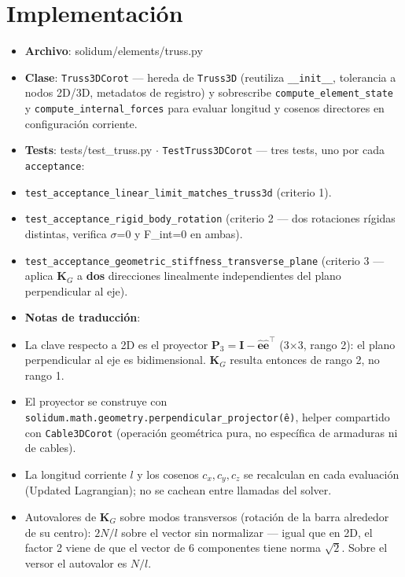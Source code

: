 \documentclass[11pt,letterpaper,oneside]{report}
\begin{document}
\section{Implementación}

\begin{itemize}
  \item \textbf{Archivo}: solidum/elements/truss.py
  \item \textbf{Clase}: \texttt{Truss3DCorot} --- hereda de \texttt{Truss3D} (reutiliza \texttt{\_\_init\_\_}, tolerancia a nodos 2D/3D, metadatos de registro) y sobrescribe \texttt{compute\_element\_state} y \texttt{compute\_internal\_forces} para evaluar longitud y cosenos directores en configuración corriente.
  \item \textbf{Tests}: tests/test\_truss.py \ensuremath{\cdot} \texttt{TestTruss3DCorot} --- tres tests, uno por cada \texttt{acceptance}:
  \item \texttt{test\_acceptance\_linear\_limit\_matches\_truss3d} (criterio 1).
  \item \texttt{test\_acceptance\_rigid\_body\_rotation} (criterio 2 --- dos rotaciones rígidas distintas, verifica \ensuremath{\sigma}=0 y F\_int=0 en ambas).
  \item \texttt{test\_acceptance\_geometric\_stiffness\_transverse\_plane} (criterio 3 --- aplica $\mathbf K_G$ a \textbf{dos} direcciones linealmente independientes del plano perpendicular al eje).
  \item \textbf{Notas de traducción}:
  \item La clave respecto a 2D es el proyector $\mathbf P_3 = \mathbf I - \hat{\mathbf e}\hat{\mathbf e}^\top$ (3\ensuremath{\times}3, rango 2): el plano perpendicular al eje es bidimensional. $\mathbf K_G$ resulta entonces de rango 2, no rango 1.
  \item El proyector se construye con \texttt{solidum.math.geometry.perpendicular\_projector(ê)}, helper compartido con \texttt{Cable3DCorot} (operación geométrica pura, no específica de armaduras ni de cables).
  \item La longitud corriente $l$ y los cosenos $c_x, c_y, c_z$ se recalculan en cada evaluación (Updated Lagrangian); no se cachean entre llamadas del solver.
  \item Autovalores de $\mathbf K_G$ sobre modos transversos (rotación de la barra alrededor de su centro): $2N/l$ sobre el vector sin normalizar --- igual que en 2D, el factor 2 viene de que el vector de 6 componentes tiene norma $\sqrt 2$. Sobre el versor el autovalor es $N/l$.
\end{itemize}
\end{document}
